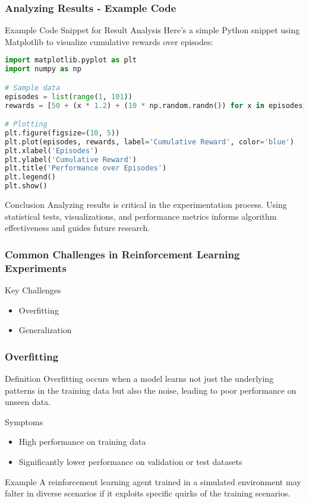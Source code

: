 \documentclass[aspectratio=169]{beamer}
\begin{document}
\begin{frame}[fragile]
  \frametitle{Analyzing Results - Example Code}
  \begin{block}{Example Code Snippet for Result Analysis}
    Here’s a simple Python snippet using Matplotlib to visualize cumulative rewards over episodes:
    \begin{lstlisting}[language=Python]
import matplotlib.pyplot as plt
import numpy as np

# Sample data
episodes = list(range(1, 101))
rewards = [50 + (x * 1.2) + (10 * np.random.randn()) for x in episodes] # Simulated rewards

# Plotting
plt.figure(figsize=(10, 5))
plt.plot(episodes, rewards, label='Cumulative Reward', color='blue')
plt.xlabel('Episodes')
plt.ylabel('Cumulative Reward')
plt.title('Performance over Episodes')
plt.legend()
plt.show()
    \end{lstlisting}
  \end{block}
  
  \begin{block}{Conclusion}
    Analyzing results is critical in the experimentation process. Using statistical tests, visualizations, and performance metrics informs algorithm effectiveness and guides future research.
  \end{block}
\end{frame}

\begin{frame}[fragile]
    \frametitle{Common Challenges in Reinforcement Learning Experiments}
    \begin{block}{Key Challenges}
        \begin{itemize}
            \item Overfitting
            \item Generalization
        \end{itemize}
    \end{block}
\end{frame}

\begin{frame}[fragile]
    \frametitle{Overfitting}
    \begin{block}{Definition}
        Overfitting occurs when a model learns not just the underlying patterns in the training data but also the noise, leading to poor performance on unseen data.
    \end{block}
    \begin{block}{Symptoms}
        \begin{itemize}
            \item High performance on training data
            \item Significantly lower performance on validation or test datasets
        \end{itemize}
    \end{block}
    \begin{block}{Example}
        A reinforcement learning agent trained in a simulated environment may falter in diverse scenarios if it exploits specific quirks of the training scenarios.
    \end{block}
\end{frame}
\end{document}
